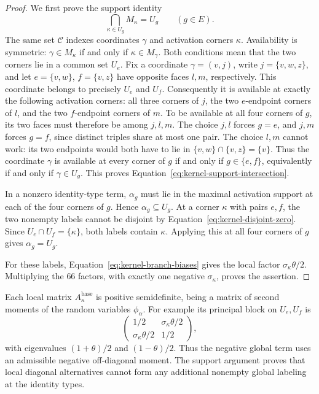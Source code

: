 \begin{proof}
We first prove the support identity
\begin{equation}
 \bigcap_{\kappa\in U_g}M_\kappa=U_g
 \qquad(g\in E).
 \label{eq:kernel-support-intersection}
\end{equation}
The same set \(\mathscr C\) indexes coordinates \(\gamma\) and
activation corners \(\kappa\). Availability is symmetric:
\(\gamma\in M_\kappa\) if and only if \(\kappa\in M_\gamma\).
Both conditions mean that the two corners lie in a common set \(U_e\).
Fix a coordinate $\gamma=(v,j)$, write $j=\{v,w,z\}$, and let
$e=\{v,w\}$, $f=\{v,z\}$ have opposite faces $l,m$, respectively.
This coordinate belongs to precisely $U_e$ and $U_f$. Consequently it
is available at exactly the following activation corners: all three
corners of $j$, the two $e$-endpoint corners of $l$, and the two
$f$-endpoint corners of $m$. To be available at all four corners of
$g$, its two faces must therefore be among $j,l,m$. The choice $j,l$
forces $g=e$, and $j,m$ forces $g=f$, since distinct triples share at
most one pair. The choice $l,m$ cannot work: its two endpoints would
both have to lie in $\{v,w\}\cap\{v,z\}=\{v\}$. Thus the coordinate
$\gamma$ is available at every corner of $g$ if and only if
$g\in\{e,f\}$, equivalently if and only if $\gamma\in U_g$.
This proves Equation~\eqref{eq:kernel-support-intersection}.

In a nonzero identity-type term, $\alpha_g$ must lie in the maximal
activation support at each of the four corners of $g$. Hence
$\alpha_g\subseteq U_g$. At a corner $\kappa$ with pairs $e,f$, the
two nonempty labels cannot be disjoint by
Equation~\eqref{eq:kernel-disjoint-zero}. Since
$U_e\cap U_f=\{\kappa\}$, both labels contain $\kappa$. Applying
this at all four corners of $g$ gives $\alpha_g=U_g$.

For these labels, Equation~\eqref{eq:kernel-branch-biases} gives
the local factor \(\sigma_\kappa\theta/2\). Multiplying the $66$ factors,
with exactly one negative $\sigma_\kappa$, proves the assertion.
\end{proof}

Each local matrix $A^{\mathrm{base}}_\kappa$ is positive semidefinite,
being a matrix of second moments of the random variables $\phi_\alpha$.
For example its principal block on $U_e,U_f$ is
\[
 \begin{pmatrix}1/2&\sigma_\kappa\theta/2\\
                 \sigma_\kappa\theta/2&1/2\end{pmatrix},
\]
with eigenvalues $(1+\theta)/2$ and $(1-\theta)/2$. Thus the negative
global term uses an admissible negative off-diagonal moment. The
support argument proves that local diagonal alternatives cannot form
any additional nonempty global labeling at the identity types.

